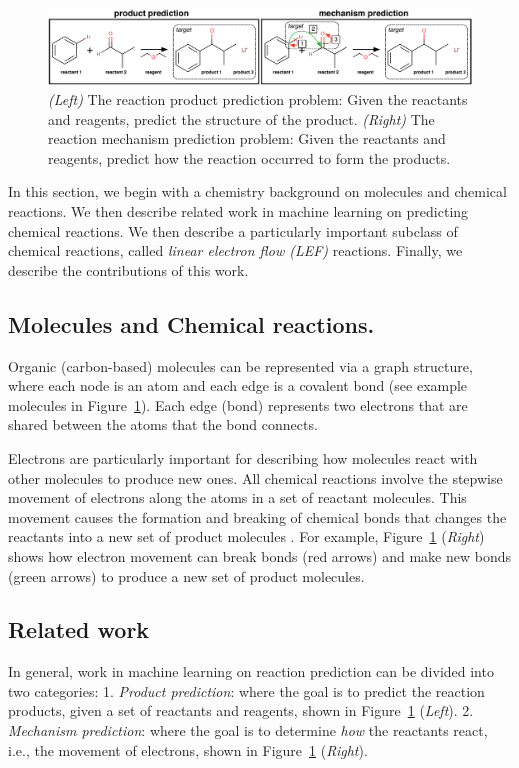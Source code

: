 
\begin{figure}[t!]
\centering
\includegraphics[width=\textwidth]{reaction_diagram.pdf}
\caption{\emph{(Left)} The reaction product prediction problem: Given the reactants and reagents, predict the structure of the product. \emph{(Right)} The reaction mechanism prediction problem: Given the reactants and reagents, predict how the reaction occurred to form the products.}
\label{fig:task-overview}

\end{figure}

In this section, we begin with a chemistry background on molecules and chemical reactions. We then describe related work in machine learning on predicting chemical reactions. We then describe a particularly important subclass of chemical reactions, called \emph{linear electron flow (LEF)} reactions. Finally, we describe the contributions of this work.



\subsection{Molecules and Chemical reactions.}
Organic (carbon-based) molecules can be represented via a graph structure, where each node is an atom and each edge is a covalent bond (see example molecules in Figure~\ref{fig:task-overview}).
Each edge (bond) represents two electrons that are shared between the atoms that the bond connects. 

Electrons are particularly important for describing how molecules react with other molecules to produce new ones. All chemical reactions involve the stepwise movement of electrons along the atoms in a set of reactant molecules. 
This movement causes the formation and breaking of chemical bonds that changes the reactants into a new set of product molecules \citep{herges1994coarctate}. For example, Figure~\ref{fig:task-overview} (\emph{Right}) shows how electron movement can break bonds (red arrows) and make new bonds (green arrows) to produce a new set of product molecules.

\subsection{Related work}
In general, work in machine learning on reaction prediction can be divided into two categories: 1. \emph{Product prediction}: where the goal is to predict the reaction products, given a set of reactants and reagents, shown in Figure~\ref{fig:task-overview} (\emph{Left}). 2. \emph{Mechanism prediction}: where the goal is to determine {\em how} the reactants react, i.e., the movement of electrons, shown in Figure~\ref{fig:task-overview} (\emph{Right}).


